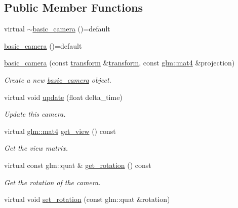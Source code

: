 \subsection*{Public Member Functions}
\begin{DoxyCompactItemize}
\item 
virtual \mbox{\hyperlink{classmoka_1_1basic__camera_a1b7c245be603c3623e54583aebe12357}{$\sim$basic\+\_\+camera}} ()=default
\item 
\mbox{\hyperlink{classmoka_1_1basic__camera_a357eb167fe7dad8a1d65a92311e1342e}{basic\+\_\+camera}} ()=default
\item 
\mbox{\hyperlink{classmoka_1_1basic__camera_a3305373cc74a56d5b40cee482959172e}{basic\+\_\+camera}} (const \mbox{\hyperlink{classmoka_1_1transform}{transform}} \&\mbox{\hyperlink{classmoka_1_1transform}{transform}}, const \mbox{\hyperlink{namespacemoka_aed2224bc0e5b79e57a8975ded94ee1aaabe14b41eb96410ea28b32bc138d885ae}{glm\+::mat4}} \&projection)
\begin{DoxyCompactList}\small\item\em Create a new \mbox{\hyperlink{classmoka_1_1basic__camera}{basic\+\_\+camera}} object. \end{DoxyCompactList}\item 
virtual void \mbox{\hyperlink{classmoka_1_1basic__camera_a43891fadfe629d3306c3863255660556}{update}} (float delta\+\_\+time)
\begin{DoxyCompactList}\small\item\em Update this camera. \end{DoxyCompactList}\item 
virtual \mbox{\hyperlink{namespacemoka_aed2224bc0e5b79e57a8975ded94ee1aaabe14b41eb96410ea28b32bc138d885ae}{glm\+::mat4}} \mbox{\hyperlink{classmoka_1_1basic__camera_a50d26f0db9969b36b29103e8a743d4c6}{get\+\_\+view}} () const
\begin{DoxyCompactList}\small\item\em Get the view matrix. \end{DoxyCompactList}\item 
virtual const glm\+::quat \& \mbox{\hyperlink{classmoka_1_1basic__camera_a1222bd9104d5dbd03964a4a340d08b06}{get\+\_\+rotation}} () const
\begin{DoxyCompactList}\small\item\em Get the rotation of the camera. \end{DoxyCompactList}\item 
virtual void \mbox{\hyperlink{classmoka_1_1basic__camera_ade33ff9968210e36f4235ad0b5a2aef5}{set\+\_\+rotation}} (const glm\+::quat \&rotation)

\end{DoxyCompactItemize}
